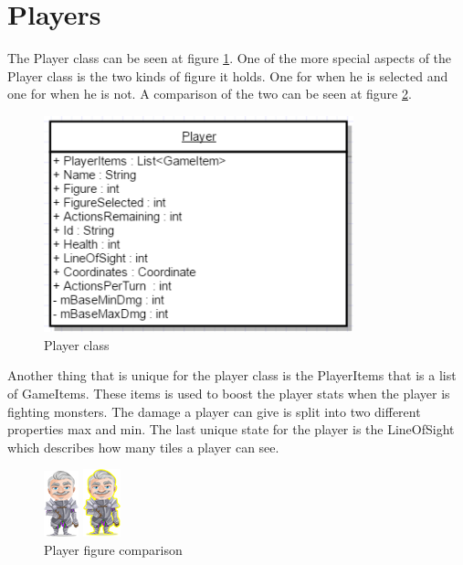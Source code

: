 \section{Players}

The Player class can be seen at figure \ref{fig:Player class}. One of the more special aspects of the Player class is the two kinds of figure it holds. One for when he is selected and one for when he is not. A comparison of the two can be seen at figure \ref{fig:PlayerFigure}.\\

\begin{figure}
	\centering
	\includegraphics[width=0.8\textwidth]{images/ClassPlayer.png}
	\caption{Player class}
	\label{fig:Player class}
\end{figure}

Another thing that is unique for the player class is the PlayerItems that is a list of GameItems. These items is used to boost the player stats when the player is fighting monsters. The damage a player can give is split into two different properties max and min. The last unique state for the player is the LineOfSight which describes how many tiles a player can see. 

\begin{figure}
		\centering
	\begin{minipage}{0.48\textwidth}
		\includegraphics{images/player_old_man.png}
		\raggedleft
	\end{minipage}
	\begin{minipage}{0.48\textwidth}
		\includegraphics{images/player_old_man_selected.png}
	\end{minipage}
		\caption{Player figure comparison}
	\label{fig:PlayerFigure}
\end{figure}

